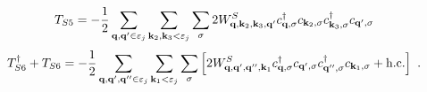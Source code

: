 \documentclass{revtex4-2}
\begin{document}
\begin{equation}\begin{aligned}
	T_{S5} &= - \frac{1}{2}\sum_{{\bf q}, {\bf q}^\prime \in \varepsilon_j}\sum_{{\bf k}_2, {\bf k}_3 < \varepsilon_j}\sum_{\sigma}2W^S_{{\bf q},{\bf k}_2,{\bf k}_3,{\bf q}^\prime} c^\dagger_{{\bf q},\sigma}c_{{\bf k}_2,\sigma}c^\dagger_{{\bf k}_3,\sigma}c_{{\bf q}^\prime,\sigma}\\
\end{aligned}\end{equation}
\begin{equation}\begin{aligned}
	T_{S6}^\dagger + T_{S6} &= - \frac{1}{2}\sum_{{\bf q}, {\bf q}^\prime, {\bf q}^{\prime\prime} \in \varepsilon_j}\sum_{{\bf k}_1 < \varepsilon_j}\sum_{\sigma}\left[2W^S_{{\bf q},{\bf q}^\prime,{\bf q}^{\prime\prime}, {\bf k}_1}c^\dagger_{{\bf q},\sigma}c_{{\bf q}^\prime,\sigma}c^\dagger_{{\bf q}^{\prime\prime},\sigma}c_{{\bf k}_1,\sigma} + \text{h.c.}\right]~.\\
\end{aligned}\end{equation}
\end{document}
